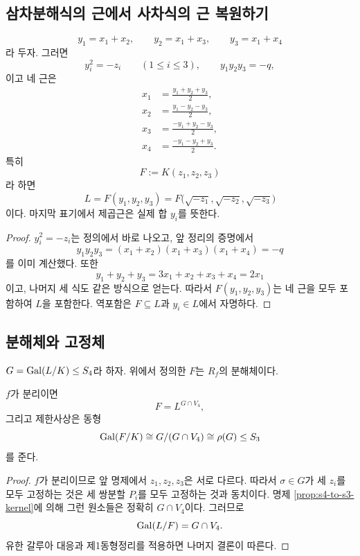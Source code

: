 \subsection{삼차분해식의 근에서 사차식의 근 복원하기}

\begin{proposition}[근의 복원 공식]
\label{prop:quartic-root-reconstruction}
\[
  y_1=x_1+x_2,
  \qquad
  y_2=x_1+x_3,
  \qquad
  y_3=x_1+x_4
\]
라 두자. 그러면
\[
  y_i^2=-z_i
  \qquad(1\le i\le3),
  \qquad
  y_1y_2y_3=-q,
\]
이고 네 근은
\[
\begin{aligned}
  x_1&=\frac{y_1+y_2+y_3}{2},\\
  x_2&=\frac{y_1-y_2-y_3}{2},\\
  x_3&=\frac{-y_1+y_2-y_3}{2},\\
  x_4&=\frac{-y_1-y_2+y_3}{2}.
\end{aligned}
\]
특히
\[
  F:=K(z_1,z_2,z_3)
\]
라 하면
\[
  \boxed{
  L=F(y_1,y_2,y_3)
   =F\bigl(\sqrt{-z_1},\sqrt{-z_2},\sqrt{-z_3}\bigr)
  }
\]
이다. 마지막 표기에서 제곱근은 실제 합 $y_i$를 뜻한다.
\end{proposition}

\begin{proof}
$y_i^2=-z_i$는 정의에서 바로 나오고, 앞 정리의 증명에서
\[
  y_1y_2y_3
  =(x_1+x_2)(x_1+x_3)(x_1+x_4)=-q
\]
를 이미 계산했다. 또한
\[
  y_1+y_2+y_3
  =3x_1+x_2+x_3+x_4=2x_1
\]
이고, 나머지 세 식도 같은 방식으로 얻는다. 따라서 $F(y_1,y_2,y_3)$는 네 근을 모두 포함하여 $L$을 포함한다. 역포함은 $F\subseteq L$과 $y_i\in L$에서 자명하다.
\end{proof}

\subsection{분해체와 고정체}

$G=\operatorname{Gal}(L/K)\le S_4$라 하자. 위에서 정의한 $F$는 $R_f$의 분해체이다.

\begin{theorem}
\label{thm:quartic-resolvent-fixed-field}
$f$가 분리이면
\[
  F=L^{G\cap V_4},
\]
그리고 제한사상은 동형
\[
  \operatorname{Gal}(F/K)
  \cong G/(G\cap V_4)
  \cong \rho(G)\le S_3
\]
를 준다.
\end{theorem}

\begin{proof}
$f$가 분리이므로 앞 명제에서 $z_1,z_2,z_3$은 서로 다르다. 따라서 $\sigma\in G$가 세 $z_i$를 모두 고정하는 것은 세 쌍분할 $P_i$를 모두 고정하는 것과 동치이다. 명제 \ref{prop:s4-to-s3-kernel}에 의해 그런 원소들은 정확히 $G\cap V_4$이다. 그러므로
\[
  \operatorname{Gal}(L/F)=G\cap V_4.
\]
유한 갈루아 대응과 제1동형정리를 적용하면 나머지 결론이 따른다.
\end{proof}

